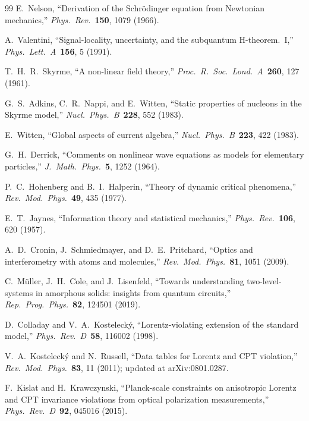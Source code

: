 ﻿\documentclass[a4paper,12pt]{article}
\begin{document}
\begin{thebibliography}{99}
  E.~Nelson,
  ``Derivation of the Schr\"odinger equation from Newtonian mechanics,''
  \emph{Phys.\ Rev.}\ \textbf{150}, 1079 (1966).

  A.~Valentini,
  ``Signal-locality, uncertainty, and the subquantum H-theorem.~I,''
  \emph{Phys.\ Lett.\ A}\ \textbf{156}, 5 (1991).

  T.~H.~R.~Skyrme,
  ``A non-linear field theory,''
  \emph{Proc.\ R.\ Soc.\ Lond.\ A}\ \textbf{260}, 127 (1961).

  G.~S.~Adkins, C.~R.~Nappi, and E.~Witten,
  ``Static properties of nucleons in the Skyrme model,''
  \emph{Nucl.\ Phys.\ B}\ \textbf{228}, 552 (1983).

  E.~Witten,
  ``Global aspects of current algebra,''
  \emph{Nucl.\ Phys.\ B}\ \textbf{223}, 422 (1983).

  G.~H.~Derrick,
  ``Comments on nonlinear wave equations as models for elementary
  particles,''
  \emph{J.\ Math.\ Phys.}\ \textbf{5}, 1252 (1964).

  P.~C.~Hohenberg and B.~I.~Halperin,
  ``Theory of dynamic critical phenomena,''
  \emph{Rev.\ Mod.\ Phys.}\ \textbf{49}, 435 (1977).

  E.~T.~Jaynes,
  ``Information theory and statistical mechanics,''
  \emph{Phys.\ Rev.}\ \textbf{106}, 620 (1957).

  A.~D.~Cronin, J.~Schmiedmayer, and D.~E.~Pritchard,
  ``Optics and interferometry with atoms and molecules,''
  \emph{Rev.\ Mod.\ Phys.}\ \textbf{81}, 1051 (2009).

  C.~M\"uller, J.~H.~Cole, and J.~Lisenfeld,
  ``Towards understanding two-level-systems in amorphous solids:
  insights from quantum circuits,''
  \emph{Rep.\ Prog.\ Phys.}\ \textbf{82}, 124501 (2019).

  D.~Colladay and V.~A.~Kosteleck\'y,
  ``Lorentz-violating extension of the standard model,''
  \emph{Phys.\ Rev.\ D}\ \textbf{58}, 116002 (1998).

  V.~A.~Kosteleck\'y and N.~Russell,
  ``Data tables for Lorentz and CPT violation,''
  \emph{Rev.\ Mod.\ Phys.}\ \textbf{83}, 11 (2011);
  updated at arXiv:0801.0287.

  F.~Kislat and H.~Krawczynski,
  ``Planck-scale constraints on anisotropic Lorentz and CPT invariance
  violations from optical polarization measurements,''
  \emph{Phys.\ Rev.\ D}\ \textbf{92}, 045016 (2015).


\end{thebibliography}
\end{document}
